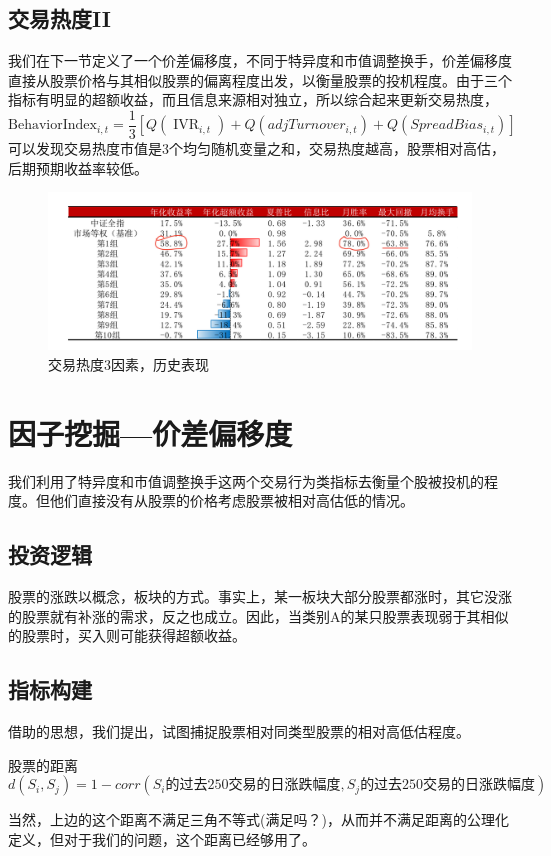 \documentclass[12pt]{article}
\begin{document}
\subsection{交易热度II}
我们在下一节定义了一个价差偏移度，不同于特异度和市值调整换手，价差偏移度直接从股票价格与其相似股票的偏离程度出发，以衡量股票的投机程度。由于三个指标有明显的超额收益，而且信息来源相对独立，所以综合起来更新交易热度，
$$ 
\text{BehaviorIndex}_{i, t}=\frac{1}{3}\left[Q\left(\operatorname{IVR}_{i, t}\right)+Q\left( adjTurnover_{i, t}\right)+Q(SpreadBias_{i,t})\right]
$$
可以发现交易热度市值是3个均匀随机变量之和，交易热度越高，股票相对高估，后期预期收益率较低。

\begin{figure}[htb]
	\centering
	\includegraphics[scale=0.5]{figure/交易热度3因素_历史表现.png}
	\caption{交易热度3因素，历史表现}
\end{figure}


\section{因子挖掘—价差偏移度}
我们利用了特异度和市值调整换手这两个交易行为类指标去衡量个股被投机的程度。但他们直接没有从股票的价格考虑股票被相对高估低的情况。
\subsection{投资逻辑}
股票的涨跌以概念，板块的方式。事实上，某一板块大部分股票都涨时，其它没涨的股票就有补涨的需求，反之也成立。因此，当类别A的某只股票表现弱于其相似的股票时，买入则可能获得超额收益。
\subsection{指标构建}
借助的思想，我们提出，试图捕捉股票相对同类型股票的相对高低估程度。
\begin{sdefinition}{股票的距离}{}
$$
d(S_i,S_j) = 1 - corr(S_i\text{的过去250交易的日涨跌幅度},S_j\text{的过去250交易的日涨跌幅度}) 
$$
\end{sdefinition}
当然，上边的这个距离不满足三角不等式(满足吗？)，从而并不满足距离的公理化定义，但对于我们的问题，这个距离已经够用了。
\end{document}
